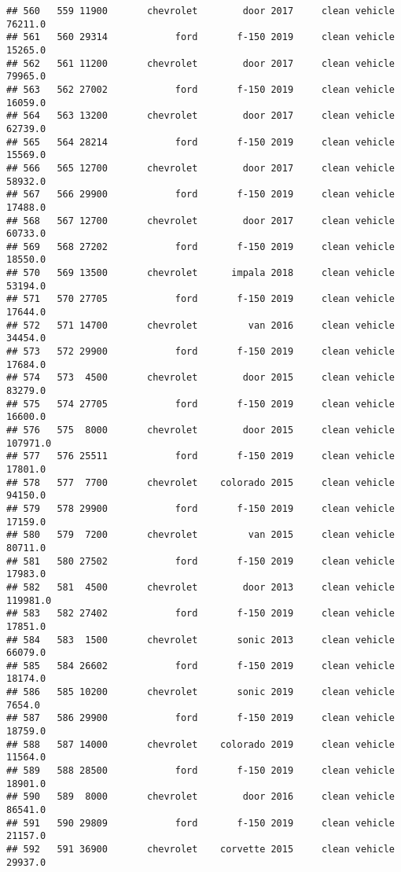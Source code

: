 \documentclass[
]{article}
\begin{document}
\begin{verbatim}
## 560   559 11900       chevrolet        door 2017     clean vehicle   76211.0
## 561   560 29314            ford       f-150 2019     clean vehicle   15265.0
## 562   561 11200       chevrolet        door 2017     clean vehicle   79965.0
## 563   562 27002            ford       f-150 2019     clean vehicle   16059.0
## 564   563 13200       chevrolet        door 2017     clean vehicle   62739.0
## 565   564 28214            ford       f-150 2019     clean vehicle   15569.0
## 566   565 12700       chevrolet        door 2017     clean vehicle   58932.0
## 567   566 29900            ford       f-150 2019     clean vehicle   17488.0
## 568   567 12700       chevrolet        door 2017     clean vehicle   60733.0
## 569   568 27202            ford       f-150 2019     clean vehicle   18550.0
## 570   569 13500       chevrolet      impala 2018     clean vehicle   53194.0
## 571   570 27705            ford       f-150 2019     clean vehicle   17644.0
## 572   571 14700       chevrolet         van 2016     clean vehicle   34454.0
## 573   572 29900            ford       f-150 2019     clean vehicle   17684.0
## 574   573  4500       chevrolet        door 2015     clean vehicle   83279.0
## 575   574 27705            ford       f-150 2019     clean vehicle   16600.0
## 576   575  8000       chevrolet        door 2015     clean vehicle  107971.0
## 577   576 25511            ford       f-150 2019     clean vehicle   17801.0
## 578   577  7700       chevrolet    colorado 2015     clean vehicle   94150.0
## 579   578 29900            ford       f-150 2019     clean vehicle   17159.0
## 580   579  7200       chevrolet         van 2015     clean vehicle   80711.0
## 581   580 27502            ford       f-150 2019     clean vehicle   17983.0
## 582   581  4500       chevrolet        door 2013     clean vehicle  119981.0
## 583   582 27402            ford       f-150 2019     clean vehicle   17851.0
## 584   583  1500       chevrolet       sonic 2013     clean vehicle   66079.0
## 585   584 26602            ford       f-150 2019     clean vehicle   18174.0
## 586   585 10200       chevrolet       sonic 2019     clean vehicle    7654.0
## 587   586 29900            ford       f-150 2019     clean vehicle   18759.0
## 588   587 14000       chevrolet    colorado 2019     clean vehicle   11564.0
## 589   588 28500            ford       f-150 2019     clean vehicle   18901.0
## 590   589  8000       chevrolet        door 2016     clean vehicle   86541.0
## 591   590 29809            ford       f-150 2019     clean vehicle   21157.0
## 592   591 36900       chevrolet    corvette 2015     clean vehicle   29937.0

\end{verbatim}
\end{document}
